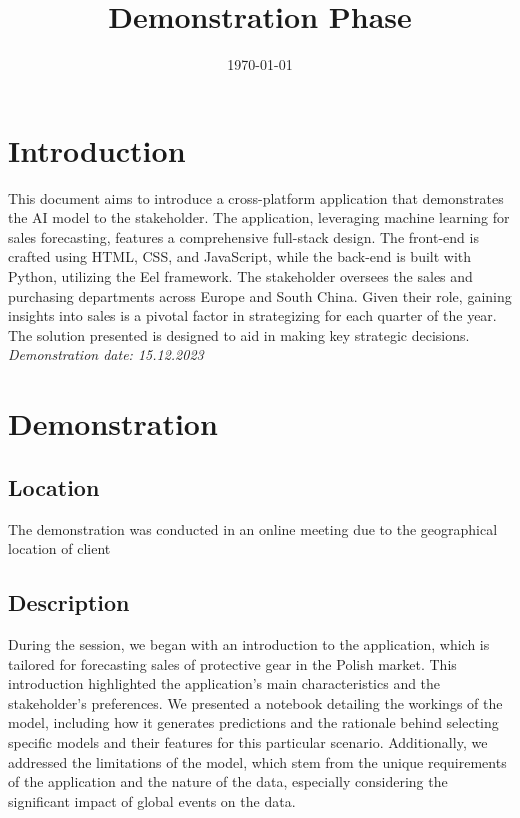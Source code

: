 \documentclass{article}
\begin{document}
\title{Demonstration Phase}
\date{\today}
\maketitle

\newpage
\tableofcontents
\newpage

\section{Introduction}
This document aims to introduce a cross-platform application that demonstrates the AI model to the stakeholder. The application, leveraging machine learning for sales forecasting, features a comprehensive full-stack design. The front-end is crafted using HTML, CSS, and JavaScript, while the back-end is built with Python, utilizing the Eel framework. The stakeholder oversees the sales and purchasing departments across Europe and South China. Given their role, gaining insights into sales is a pivotal factor in strategizing for each quarter of the year. The solution presented is designed to aid in making key strategic decisions.
\smallbreak
\textit{Demonstration date: 15.12.2023}
\section{Demonstration}
\subsection{Location}
The demonstration was conducted in an online meeting due to the geographical location of client
\subsection{Description}
During the session, we began with an introduction to the application, which is tailored for forecasting sales of protective gear in the Polish market. This introduction highlighted the application's main characteristics and the stakeholder's preferences. We presented a notebook detailing the workings of the model, including how it generates predictions and the rationale behind selecting specific models and their features for this particular scenario. Additionally, we addressed the limitations of the model, which stem from the unique requirements of the application and the nature of the data, especially considering the significant impact of global events on the data.
\end{document}
